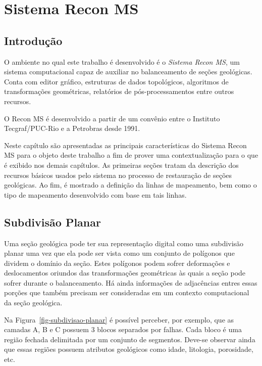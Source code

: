 
\chapter{Sistema Recon MS}

\section{Introdução}

O ambiente no qual este trabalho é desenvolvido é o \textit{Sistema Recon MS}, um sistema computacional capaz de auxiliar no balanceamento de seções geológicas. Conta com editor gráfico, estruturas de dados topológicos, algoritmos de transformações geométricas, relatórios de pós-processamentos entre outros recursos.

O Recon MS é desenvolvido a partir de um convênio entre o Instituto Tecgraf/PUC-Rio e a Petrobras desde 1991.

Neste capítulo são apresentadas as principais características do Sistema Recon MS para o objeto deste trabalho a fim de prover uma contextualização para o que é exibido nos demais capítulos. As primeiras seções tratam da descrição dos recursos básicos usados pelo sistema no processo de restauração de seções geológicas. Ao fim, é mostrado a definição da linhas de mapeamento, bem como o tipo de mapeamento desenvolvido com base em tais linhas.

\section{Subdivisão Planar} %

Uma seção geológica pode ter sua representação digital como uma subdivisão planar uma vez que ela pode ser vista como um conjunto de polígonos que dividem o domínio da seção. Estes polígonos podem sofrer deformações e deslocamentos oriundos das transformações geométricas às quais a seção pode sofrer durante o balanceamento. Há ainda informações de adjacências entres essas porções que também precisam ser consideradas em um contexto computacional da seção geológica.

Na Figura~\ref{fig-subdivisao-planar} é possível perceber, por exemplo, que as camadas A, B e C possuem 3 blocos separados por falhas. Cada bloco é uma região fechada delimitada por um conjunto de segmentos. Deve-se observar ainda que essas regiões possuem atributos geológicos como idade, litologia, porosidade, etc.

